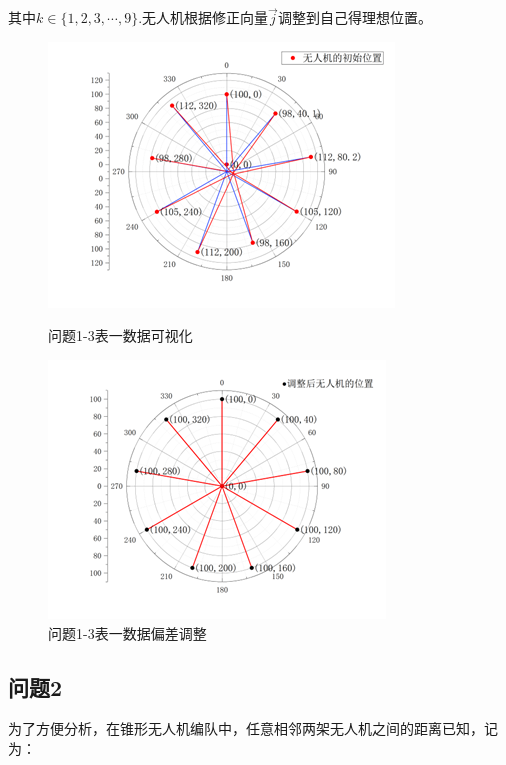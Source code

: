 其中$k\in\{1, 2, 3, \cdots, 9\}$.无人机根据修正向量$\overrightarrow{j}$调整到自己得理想位置。

\begin{figure}[htbp]
    \centering

    \begin{minipage}{15em}
        \centering
        \includegraphics[scale=0.5]{res/figure112041A.png}
        \caption{问题1-3表一数据可视化}
    \end{minipage}
    \qquad

    \begin{minipage}{15em}
        \centering
        \includegraphics[scale=0.5]{res/figure112041B.png}
        \caption{问题1-3表一数据偏差调整}
    \end{minipage}

\end{figure}

\subsection{问题2}

为了方便分析，在锥形无人机编队中，任意相邻两架无人机之间的距离已知，记为：

